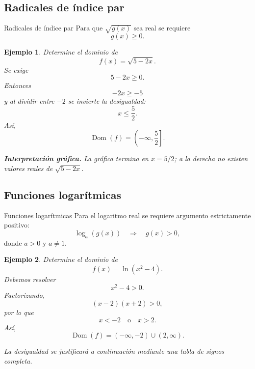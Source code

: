 \documentclass[aspectratio=169,10pt]{beamer}
\newtheorem{ejemplo}{Ejemplo}
\newcommand{\Dom}{\operatorname{Dom}}
\begin{document}
\subsection*{Radicales de índice par}
\begin{frame}{Radicales de índice par}
Para que $\sqrt{g(x)}$ sea real se requiere
\[
g(x)\geq0.
\]

\begin{ejemplo}
Determine el dominio de
\[
f(x)=\sqrt{5-2x}.
\]
Se exige
\[
5-2x\geq0.
\]
Entonces
\[
-2x\geq-5
\]
y al dividir entre $-2$ se invierte la desigualdad:
\[
x\leq\frac52.
\]
Así,
\[
\Dom(f)=\left(-\infty,\frac52\right].
\]

\textbf{Interpretación gráfica.} La gráfica termina en $x=5/2$; a la derecha
no existen valores reales de $\sqrt{5-2x}$.
\begin{center}
\end{center}
\end{ejemplo}
\end{frame}
\subsection*{Funciones logarítmicas}
\begin{frame}{Funciones logarítmicas}
Para el logaritmo real se requiere argumento estrictamente positivo:
\[
\log_a(g(x))
\quad\Longrightarrow\quad
g(x)>0,
\]
donde $a>0$ y $a\neq1$.

\begin{ejemplo}
Determine el dominio de
\[
f(x)=\ln(x^2-4).
\]
Debemos resolver
\[
x^2-4>0.
\]
Factorizando,
\[
(x-2)(x+2)>0,
\]
por lo que
\[
x<-2\quad\text{o}\quad x>2.
\]
Así,
\[
\Dom(f)=(-\infty,-2)\cup(2,\infty).
\]

La desigualdad se justificará a continuación mediante una tabla de signos completa.
\end{ejemplo}
\end{frame}
\end{document}

